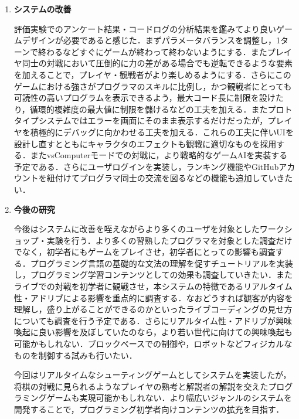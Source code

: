 \begin{enumerate}
  \item {\bf システムの改善}

  評価実験でのアンケート結果・コードログの分析結果を鑑みてより良いゲームデザインが必要であると感じた．まずパラメータバランスを調整し，1ターンで終わるなどすぐにゲームが終わって終わないようにする．またプレイヤ同士の対戦において圧倒的に力の差がある場合でも逆転できるような要素を加えることで，プレイヤ・観戦者がより楽しめるようにする．さらにこのゲームにおける強さがプログラマのスキルに比例し，かつ観戦者にとっても可読性の高いプログラムを表示できるよう，最大コード長に制限を設けたり，循環的複雑度の最大値に制限を儲けるなどの工夫を加える．またプロトタイプシステムではエラーを画面にそのまま表示するだけだったが，プレイヤを積極的にデバッグに向かわせる工夫を加える．これらの工夫に伴いUIを設計し直すとともにキャラクタのエフェクトも観戦に適切なものを採用する．またvsComputerモードでの対戦に，より戦略的なゲームAIを実装する予定である．さらにユーザログインを実装し，ランキング機能やGitHubアカウントを紐付けてプログラマ同士の交流を図るなどの機能も追加していきたい．

  \item {\bf 今後の研究}

  今後はシステムに改善を咥えながらより多くのユーザを対象としたワークショップ・実験を行う．より多くの習熟したプログラマを対象とした調査だけでなく，初学者にもゲームをプレイさせ，初学者にとっての影響も調査する．プログラミング言語の基礎的な文法の理解を促すチュートリアルを実装し，プログラミング学習コンテンツとしての効果も調査していきたい．またライブでの対戦を初学者に観戦させ，本システムの特徴であるリアルタイム性・アドリブによる影響を重点的に調査する．なおどうすれば観客が内容を理解し，盛り上がることができるのかといったライブコーディングの見せ方についても調査を行う予定である．さらにリアルタイム性・アドリブが興味喚起に良い影響を及ぼしていたのなら，より若い世代に向けての興味喚起も可能かもしれない．ブロックベースでの制御や，ロボットなどフィジカルなものを制御する試みも行いたい．

  今回はリアルタイムなシューティングゲームとしてシステムを実装したが，将棋の対戦に見られるようなプレイヤの熟考と解説者の解説を交えたプログラミングゲームも実現可能かもしれない．より幅広いジャンルのシステムを開発することで，プログラミング初学者向けコンテンツの拡充を目指す．
\end{enumerate}

